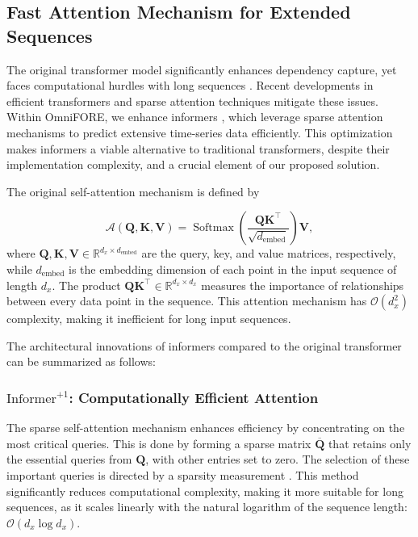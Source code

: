 \subsection{Fast Attention Mechanism for Extended Sequences}

The original transformer model \cite{vaswani2017attention} significantly enhances dependency capture, yet faces computational hurdles with long sequences \cite{wen2022transformers}. Recent developments in efficient transformers \cite{fasterandlightertransformers} and sparse attention techniques \cite{gorbett2023sparse, STRec, ma2024multivariate} mitigate these issues. Within OmniFORE, we enhance informers \cite{zhou2021informer}, which leverage sparse attention mechanisms to predict extensive time-series data efficiently. This optimization makes informers a viable alternative to traditional transformers, despite their implementation complexity, and a crucial element of our proposed solution.

The original self-attention mechanism \cite{vaswani2017attention} is defined by

\begin{equation}
\mathcal{A}(\mathbf{Q}, \mathbf{K}, \mathbf{V}) = \operatorname{Softmax}\left(\frac{\mathbf{QK}^\top}{\sqrt{d_{\text{embed}}}}\right) \mathbf{V},
\end{equation}
where $\mathbf{Q}, \mathbf{K}, \mathbf{V} \in \mathbb{R}^{d_x \times d_{\text{embed}}}$ are the query, key, and value matrices, respectively, while $d_{\text{embed}}$ is the embedding dimension of each point in the input sequence of length $d_x$. The product $\mathbf{QK}^\top \in \mathbb{R}^{d_x \times d_x}$ measures the importance of relationships between every data point in the sequence. This attention mechanism has $\mathcal{O}(d_x^2)$ complexity, making it inefficient for long input sequences.

The architectural innovations of informers compared to the original transformer can be summarized as follows:

\subsubsection*{\textbf{$\text{Informer}^{+1}$: Computationally Efficient Attention}}

The sparse self-attention mechanism enhances efficiency by concentrating on the most critical queries. This is done by forming a sparse matrix $\overline{\mathbf{Q}}$ that retains only the essential queries from $\mathbf{Q}$, with other entries set to zero. The selection of these important queries is directed by a sparsity measurement \cite{zhou2021informer}. This method significantly reduces computational complexity, making it more suitable for long sequences, as it scales linearly with the natural logarithm of the sequence length: $\mathcal{O}(d_x \log d_x)$.

